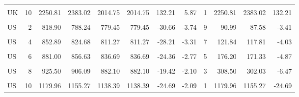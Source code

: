 \begin{table}[!h]
{\begin{tabular}[t]{lrrrrrrrrrrr}
\cellcolor{gray!10}{UK} & \cellcolor{gray!10}{9} & \cellcolor{gray!10}{2035.41} & \cellcolor{gray!10}{2182.57} & \cellcolor{gray!10}{1796.88} & \cellcolor{gray!10}{1796.88} & \cellcolor{gray!10}{147.16} & \cellcolor{gray!10}{7.23} & \cellcolor{gray!10}{2} & \cellcolor{gray!10}{1017.70} & \cellcolor{gray!10}{1091.28} & \cellcolor{gray!10}{73.58}\\
UK & 10 & 2250.81 & 2383.02 & 2014.75 & 2014.75 & 132.21 & 5.87 & 1 & 2250.81 & 2383.02 & 132.21\\
\addlinespace
\cellcolor{gray!10}{US} & \cellcolor{gray!10}{1} & \cellcolor{gray!10}{766.98} & \cellcolor{gray!10}{738.77} & \cellcolor{gray!10}{727.97} & \cellcolor{gray!10}{727.97} & \cellcolor{gray!10}{-28.21} & \cellcolor{gray!10}{-3.68} & \cellcolor{gray!10}{10} & \cellcolor{gray!10}{76.70} & \cellcolor{gray!10}{73.88} & \cellcolor{gray!10}{-2.82}\\
US & 2 & 818.90 & 788.24 & 779.45 & 779.45 & -30.66 & -3.74 & 9 & 90.99 & 87.58 & -3.41\\
\cellcolor{gray!10}{US} & \cellcolor{gray!10}{3} & \cellcolor{gray!10}{854.84} & \cellcolor{gray!10}{826.07} & \cellcolor{gray!10}{812.49} & \cellcolor{gray!10}{812.49} & \cellcolor{gray!10}{-28.77} & \cellcolor{gray!10}{-3.37} & \cellcolor{gray!10}{8} & \cellcolor{gray!10}{106.86} & \cellcolor{gray!10}{103.26} & \cellcolor{gray!10}{-3.60}\\
US & 4 & 852.89 & 824.68 & 811.27 & 811.27 & -28.21 & -3.31 & 7 & 121.84 & 117.81 & -4.03\\
\cellcolor{gray!10}{US} & \cellcolor{gray!10}{5} & \cellcolor{gray!10}{836.08} & \cellcolor{gray!10}{814.17} & \cellcolor{gray!10}{789.97} & \cellcolor{gray!10}{789.97} & \cellcolor{gray!10}{-21.91} & \cellcolor{gray!10}{-2.62} & \cellcolor{gray!10}{6} & \cellcolor{gray!10}{139.35} & \cellcolor{gray!10}{135.69} & \cellcolor{gray!10}{-3.65}\\
\addlinespace
US & 6 & 881.00 & 856.63 & 836.69 & 836.69 & -24.36 & -2.77 & 5 & 176.20 & 171.33 & -4.87\\
\cellcolor{gray!10}{US} & \cellcolor{gray!10}{7} & \cellcolor{gray!10}{917.79} & \cellcolor{gray!10}{898.46} & \cellcolor{gray!10}{873.10} & \cellcolor{gray!10}{873.10} & \cellcolor{gray!10}{-19.33} & \cellcolor{gray!10}{-2.11} & \cellcolor{gray!10}{4} & \cellcolor{gray!10}{229.45} & \cellcolor{gray!10}{224.62} & \cellcolor{gray!10}{-4.83}\\
US & 8 & 925.50 & 906.09 & 882.10 & 882.10 & -19.42 & -2.10 & 3 & 308.50 & 302.03 & -6.47\\
\cellcolor{gray!10}{US} & \cellcolor{gray!10}{9} & \cellcolor{gray!10}{952.26} & \cellcolor{gray!10}{939.14} & \cellcolor{gray!10}{912.16} & \cellcolor{gray!10}{912.16} & \cellcolor{gray!10}{-13.12} & \cellcolor{gray!10}{-1.38} & \cellcolor{gray!10}{2} & \cellcolor{gray!10}{476.13} & \cellcolor{gray!10}{469.57} & \cellcolor{gray!10}{-6.56}\\
US & 10 & 1179.96 & 1155.27 & 1138.39 & 1138.39 & -24.69 & -2.09 & 1 & 1179.96 & 1155.27 & -24.69\\
\bottomrule
\end{tabular}}
\end{table}
